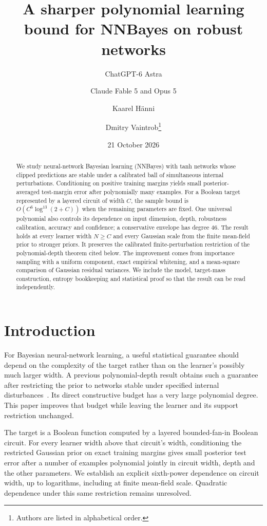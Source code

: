 \documentclass[11pt]{article}
\title{A sharper polynomial learning bound for NNBayes on robust networks}
\author{ChatGPT-6 Astra \and Claude Fable 5 and Opus 5 \and Kaarel H\"anni \and Dmitry Vaintrob\thanks{Authors are listed in alphabetical order.}}
\date{21 October 2026}
\begin{document}
\maketitle
\begin{abstract}
We study neural-network Bayesian learning (NNBayes) with tanh networks whose clipped
predictions are stable under a calibrated ball of simultaneous internal
perturbations. Conditioning on positive training margins yields small
posterior-averaged test-margin error after polynomially many examples.
For a Boolean target represented by a layered circuit of
width $C$, the sample bound is $O(C^6\log^{13}(2+C))$ when the remaining parameters
are fixed. One universal polynomial also controls its dependence on input
dimension, depth, robustness calibration, accuracy and confidence; a
conservative envelope has degree $46$. The result holds at every learner
width $N\ge C$ and every Gaussian scale from the finite mean-field prior
to stronger priors. It preserves the calibrated finite-perturbation
restriction of the polynomial-depth theorem cited below. The improvement comes from importance
sampling with a uniform component, exact empirical whitening, and a
mean-square comparison of Gaussian residual variances. We include the
model, target-mass construction, entropy bookkeeping and statistical proof
so that the result can be read independently.
\end{abstract}

\section{Introduction}
For Bayesian neural-network learning, a useful statistical guarantee should
depend on the complexity of the target rather than on the learner's
possibly much larger width. A previous polynomial-depth result obtains
such a guarantee after restricting the prior to networks stable under
specified internal disturbances~\cite{earlier}. Its direct constructive
budget has a very large polynomial degree. This paper improves that budget
while leaving the learner and its support restriction unchanged.

The target is a Boolean function computed by a layered bounded-fan-in
Boolean circuit. For every learner width above that circuit's width,
conditioning the restricted Gaussian prior on exact training margins gives
small posterior test error after a number of examples polynomial jointly
in circuit width, depth and the other parameters. We establish an explicit
sixth-power dependence on circuit width, up to logarithms, including at
finite mean-field scale. Quadratic dependence under this same restriction
remains unresolved.
\end{document}
